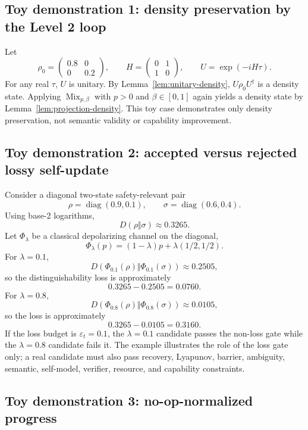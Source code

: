 \documentclass[11pt,a4paper]{article}
\newcommand{\eps}{\varepsilon}
\begin{document}
\subsection{Toy demonstration 1: density preservation by the Level 2 loop}

Let
\[
\rho_0=\begin{pmatrix}0.8&0\\0&0.2\end{pmatrix},
\qquad
H=\begin{pmatrix}0&1\\1&0\end{pmatrix},
\qquad
U=\exp(-iH\tau).
\]
For any real \(\tau\), \(U\) is unitary.  By Lemma~\ref{lem:unitary-density}, \(U\rho_0U^{\dagger}\) is a density state.  Applying \(\operatorname{Mix}_{p,\beta}\) with \(p>0\) and \(\beta\in[0,1]\) again yields a density state by Lemma~\ref{lem:projection-density}.  This toy case demonstrates only density preservation, not semantic validity or capability improvement.

\subsection{Toy demonstration 2: accepted versus rejected lossy self-update}

Consider a diagonal two-state safety-relevant pair
\[
\rho=\operatorname{diag}(0.9,0.1),
\qquad
\sigma=\operatorname{diag}(0.6,0.4).
\]
Using base-2 logarithms,
\[
D(\rho\Vert\sigma)\approx0.3265.
\]
Let \(\Phi_\lambda\) be a classical depolarizing channel on the diagonal,
\[
\Phi_\lambda(p)=(1-\lambda)p+\lambda(1/2,1/2).
\]
For \(\lambda=0.1\),
\[
D(\Phi_{0.1}(\rho)\Vert\Phi_{0.1}(\sigma))\approx0.2505,
\]
so the distinguishability loss is approximately
\[
0.3265-0.2505=0.0760.
\]
For \(\lambda=0.8\),
\[
D(\Phi_{0.8}(\rho)\Vert\Phi_{0.8}(\sigma))\approx0.0105,
\]
so the loss is approximately
\[
0.3265-0.0105=0.3160.
\]
If the loss budget is \(\eps_t=0.1\), the \(\lambda=0.1\) candidate passes the non-loss gate while the \(\lambda=0.8\) candidate fails it.  The example illustrates the role of the loss gate only; a real candidate must also pass recovery, Lyapunov, barrier, ambiguity, semantic, self-model, verifier, resource, and capability constraints.

\subsection{Toy demonstration 3: no-op-normalized progress}
\end{document}
